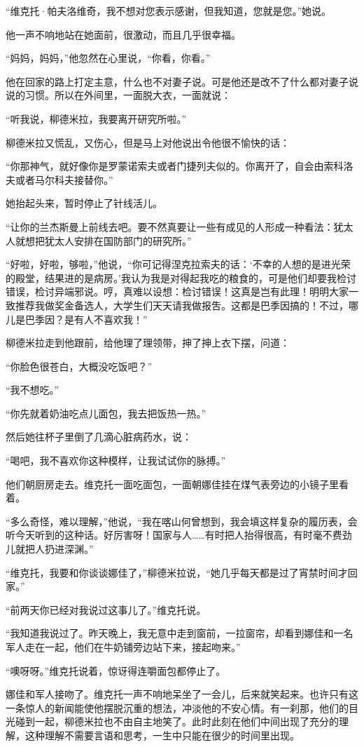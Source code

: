 “维克托·帕夫洛维奇，我不想对您表示感谢，但我知道，您就是您。”她说。

他一声不响地站在她面前，很激动，而且几乎很幸福。

“妈妈，妈妈，”他忽然在心里说，“你看，你看。”

他在回家的路上打定主意，什么也不对妻子说。可是他还是改不了什么都对妻子说说的习惯。所以在外间里，一面脱大衣，一面就说：

“听我说，柳德米拉，我要离开研究所啦。”

柳德米拉又慌乱，又伤心，但是马上对他说出令他很不愉快的话：

“你那神气，就好像你是罗蒙诺索夫或者门捷列夫似的。你离开了，自会由索科洛夫或者马尔科夫接替你。”

她抬起头来，暂时停止了针线活儿。

“让你的兰杰斯曼上前线去吧。要不然真要让一些有成见的人形成一种看法：犹太人就想把犹太人安排在国防部门的研究所。”

“好啦，好啦，够啦，”他说，“你可记得涅克拉索夫的话：‘不幸的人想的是进光荣的殿堂，结果进的是病房。’我认为我是对得起我吃的粮食的，可是他们却要我检讨错误，检讨异端邪说。哼，真难以设想：检讨错误！这真是岂有此理！明明大家一致推荐我做奖金备选人，大学生们天天请我做报吿。这都是巴季因搞的！不过，哪儿是巴季因？是有人不喜欢我！”

柳德米拉走到他跟前，给他理了理领带，抻了抻上衣下摆，问道：

“你脸色很苍白，大概没吃饭吧？”

“我不想吃。”

“你先就着奶油吃点儿面包，我去把饭热一热。”

然后她往杯子里倒了几滴心脏病药水，说：

“喝吧，我不喜欢你这种模样，让我试试你的脉搏。”

他们朝厨房走去。维克托一面吃面包，一面朝娜佳挂在煤气表旁边的小镜子里看着。

“多么奇怪，难以理解，”他说，“我在喀山何曾想到，我会填这样复杂的履历表，会听今天听到的这种话。好厉害呀！国家与人……有时把人抬得很高，有时毫不费劲儿就把人扔进深渊。”

“维克托，我要和你谈谈娜佳了，”柳德米拉说，“她几乎每天都是过了宵禁时间才回家。”

“前两天你已经对我说过这事儿了。”维克托说。

“我知道我说过了。昨天晚上，我无意中走到窗前，一拉窗帘，却看到娜佳和一名军人走在一起，他们在牛奶铺旁边站下来，接起吻来。”

“噢呀呀。”维克托说着，惊讶得连嚼面包都停止了。

娜佳和军人接吻了。维克托一声不响地呆坐了一会儿，后来就笑起来。也许只有这一条惊人的新闻能使他摆脱沉重的想法，冲淡他的不安心情。有一刹那，他们的目光碰到一起，柳德米拉也不由自主地笑了。此时此刻在他们中间出现了充分的理解，这种理解不需要言语和思考，一生中只能在很少的时间里出现。

